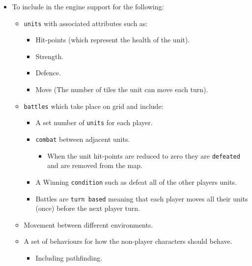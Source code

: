 \begin{itemize}
\item To include in the engine support for the following:

\begin{itemize}
\item \texttt{units} with associated attributes such as:

\begin{itemize}
\item Hit-points (which represent the health of the unit).

\item Strength.

\item Defence.

\item Move (The number of tiles the unit can move each turn).

\end{itemize}

\item \texttt{battles} which take place on grid and include:

\begin{itemize}
\item A set number of \texttt{units} for each player.

\item \texttt{combat} between adjacent units.

\begin{itemize}
\item When the unit hit-points are reduced to zero they are \texttt{defeated}
 and are removed from the map.

\end{itemize}

\item A Winning \texttt{condition} such as defeat all of the other players units.

\item Battles are \texttt{turn based} meaning that each player moves all their units (once)
 before the next player turn.

\end{itemize}

\item Movement between different environments.

\item A set of behaviours for how the non-player characters should behave.

\begin{itemize}
\item Including pathfinding.


\end{itemize}
\end{itemize}
\end{itemize}
